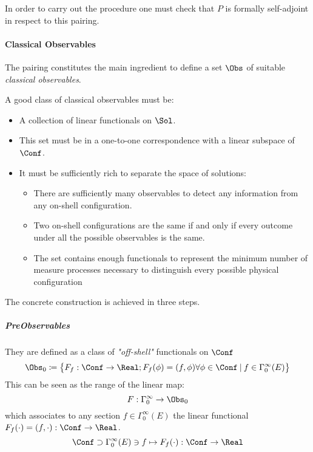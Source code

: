 \documentclass[Main]{subfiles}
\begin{document}
   				In order to carry out the procedure one must check that $P$ is formally self-adjoint in respect to this pairing.

   					
   		\paragraph{Classical Observables}
   		The pairing constitutes the main ingredient to define a set $\Obs$ of suitable \emph{classical observables}.
   		\begin{remark}
   			A good class of classical observables must be:
   			\begin{itemize}
   				\item A collection of  linear functionals on $\Sol$.
   				\item This set must be in a one-to-one correspondence  with a linear subspace of $\Conf$.
   				\item It must be sufficiently rich to separate the space of solutions:
   					\begin{itemize}
   						\item There are sufficiently many observables to detect any information from any on-shell configuration.
   						\item Two on-shell configurations are the same if and only if every outcome under all the possible observables is the same.
   						\item The set contains enough functionals to represent the minimum number of measure processes necessary to distinguish every possible physical configuration
   					\end{itemize}
   			\end{itemize}
   		\end{remark}
   		The concrete construction is achieved in three steps.
   		
 			\subparagraph{PreObservables}
 				They are defined as a class of \emph{"off-shell"} functionals on $\Conf$
   							\begin{displaymath}
   								\Obs_0 \coloneqq \big\{ F_f: \Conf \rightarrow \Real ;  F_f(\phi)=( f, \phi) \forall \phi \in \Conf \:\vert
   								\:  f \in \Gamma_0^\infty(E)	\big\}
   							\end{displaymath}
   				This can be seen as the range of the linear map:
   				\begin{displaymath}
   					F: \Gamma_0^\infty \rightarrow \Obs_0
  	 			\end{displaymath}
   				which associates to any section $f\in \Gamma_0^\infty(E)$ the linear functional 
   				$F_f(\cdot) = (f,\cdot) :\Conf \rightarrow \Real$.
  	 			\begin{displaymath}
   					\Conf 	\supset \Gamma^\infty_0(E) \ni f \mapsto F_f(\cdot):\Conf \rightarrow \Real
   				\end{displaymath}			
			
\end{document}
